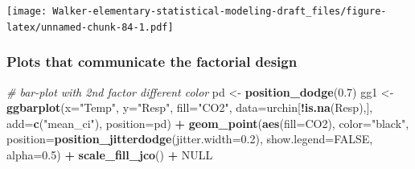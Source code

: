 \documentclass[]{book}
\newenvironment{Shaded}{\begin{snugshade}}{\end{snugshade}}
\newcommand{\KeywordTok}[1]{\textcolor[rgb]{0.13,0.29,0.53}{\textbf{#1}}}
\newcommand{\DataTypeTok}[1]{\textcolor[rgb]{0.13,0.29,0.53}{#1}}
\newcommand{\FloatTok}[1]{\textcolor[rgb]{0.00,0.00,0.81}{#1}}
\newcommand{\StringTok}[1]{\textcolor[rgb]{0.31,0.60,0.02}{#1}}
\newcommand{\CommentTok}[1]{\textcolor[rgb]{0.56,0.35,0.01}{\textit{#1}}}
\newcommand{\OtherTok}[1]{\textcolor[rgb]{0.56,0.35,0.01}{#1}}
\newcommand{\OperatorTok}[1]{\textcolor[rgb]{0.81,0.36,0.00}{\textbf{#1}}}
\newcommand{\NormalTok}[1]{#1}
\begin{document}
\texttt{[image: Walker-elementary-statistical-modeling-draft\_files/figure-latex/unnamed-chunk-84-1.pdf]}

\subsubsection{Plots that communicate the factorial
design}\label{plots-that-communicate-the-factorial-design}

\begin{Shaded}
\begin{Highlighting}[]
\CommentTok{# bar-plot with 2nd factor different color}
\NormalTok{pd <-}\StringTok{ }\KeywordTok{position_dodge}\NormalTok{(}\FloatTok{0.7}\NormalTok{)}
\NormalTok{gg1 <-}\StringTok{ }\KeywordTok{ggbarplot}\NormalTok{(}\DataTypeTok{x=}\StringTok{"Temp"}\NormalTok{,}
          \DataTypeTok{y=}\StringTok{"Resp"}\NormalTok{,}
          \DataTypeTok{fill=}\StringTok{"CO2"}\NormalTok{,}
          \DataTypeTok{data=}\NormalTok{urchin[}\OperatorTok{!}\KeywordTok{is.na}\NormalTok{(Resp),],}
          \DataTypeTok{add=}\KeywordTok{c}\NormalTok{(}\StringTok{"mean_ci"}\NormalTok{),}
          \DataTypeTok{position=}\NormalTok{pd) }\OperatorTok{+}
\StringTok{  }\KeywordTok{geom_point}\NormalTok{(}\KeywordTok{aes}\NormalTok{(}\DataTypeTok{fill=}\NormalTok{CO2), }
             \DataTypeTok{color=}\StringTok{"black"}\NormalTok{, }
             \DataTypeTok{position=}\KeywordTok{position_jitterdodge}\NormalTok{(}\DataTypeTok{jitter.width=}\FloatTok{0.2}\NormalTok{), }
             \DataTypeTok{show.legend=}\OtherTok{FALSE}\NormalTok{, }
             \DataTypeTok{alpha=}\FloatTok{0.5}\NormalTok{) }\OperatorTok{+}
\StringTok{  }\KeywordTok{scale_fill_jco}\NormalTok{() }\OperatorTok{+}
\StringTok{  }\OtherTok{NULL}


\end{Highlighting}
\end{Shaded}
\end{document}
